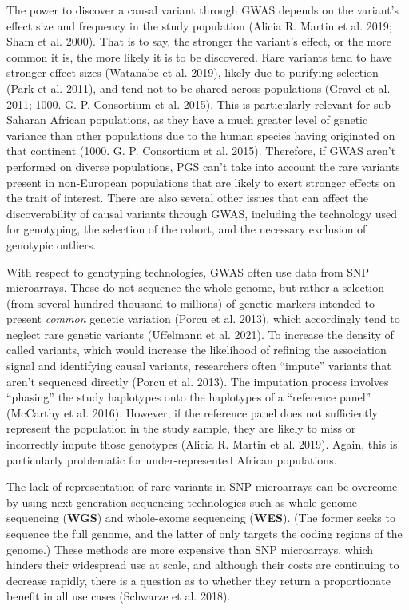 \documentclass[
]{book}
\begin{document}
The power to discover a causal variant through GWAS depends on the variant's effect size and frequency in the study population (Alicia R. Martin et al. 2019; Sham et al. 2000). That is to say, the stronger the variant's effect, or the more common it is, the more likely it is to be discovered. Rare variants tend to have stronger effect sizes (Watanabe et al. 2019), likely due to purifying selection (Park et al. 2011), and tend not to be shared across populations (Gravel et al. 2011; 1000. G. P. Consortium et al. 2015). This is particularly relevant for sub-Saharan African populations, as they have a much greater level of genetic variance than other populations due to the human species having originated on that continent (1000. G. P. Consortium et al. 2015). Therefore, if GWAS aren't performed on diverse populations, PGS can't take into account the rare variants present in non-European populations that are likely to exert stronger effects on the trait of interest. There are also several other issues that can affect the discoverability of causal variants through GWAS, including the technology used for genotyping, the selection of the cohort, and the necessary exclusion of genotypic outliers.

With respect to genotyping technologies, GWAS often use data from SNP microarrays. These do not sequence the whole genome, but rather a selection (from several hundred thousand to millions) of genetic markers intended to present \emph{common} genetic variation (Porcu et al. 2013), which accordingly tend to neglect rare genetic variants (Uffelmann et al. 2021). To increase the density of called variants, which would increase the likelihood of refining the association signal and identifying causal variants, researchers often ``impute'' variants that aren't sequenced directly (Porcu et al. 2013). The imputation process involves ``phasing'' the study haplotypes onto the haplotypes of a ``reference panel'' (McCarthy et al. 2016). However, if the reference panel does not sufficiently represent the population in the study sample, they are likely to miss or incorrectly impute those genotypes (Alicia R. Martin et al. 2019). Again, this is particularly problematic for under-represented African populations.

The lack of representation of rare variants in SNP microarrays can be overcome by using next-generation sequencing technologies such as whole-genome sequencing (\textbf{WGS}) and whole-exome sequencing (\textbf{WES}). (The former seeks to sequence the full genome, and the latter of only targets the coding regions of the genome.) These methods are more expensive than SNP microarrays, which hinders their widespread use at scale, and although their costs are continuing to decrease rapidly, there is a question as to whether they return a proportionate benefit in all use cases (Schwarze et al. 2018).
\end{document}
